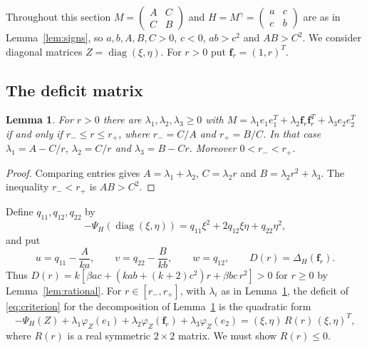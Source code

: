 \documentclass[11pt]{amsart}
\newtheorem{lemma}[theorem]{Lemma}
\theoremstyle{definition}
\theoremstyle{remark}
\numberwithin{equation}{section}
\newcommand{\diag}{\operatorname{diag}}
\newcommand{\bff}{\mathbf{f}}
\begin{document}
Throughout this section $M=\begin{pmatrix}A&C\\ C&B\end{pmatrix}$ and $H=M^\gamma=\begin{pmatrix}a&c\\ c&b\end{pmatrix}$ are as in Lemma~\ref{lem:signs}, so $a,b,A,B,C>0$, $c<0$, $ab>c^2$ and $AB>C^2$. We consider diagonal matrices $Z=\diag(\xi,\eta)$. For $r>0$ put $\bff_r=(1,r)^T$.

\subsection{The deficit matrix}

\begin{lemma}\label{lem:threedec}
For $r>0$ there are $\lambda_1,\lambda_2,\lambda_3\ge0$ with $M=\lambda_1e_1e_1^T+\lambda_2\bff_r\bff_r^T+\lambda_3e_2e_2^T$ if and only if $r_-\le r\le r_+$, where $r_-=C/A$ and $r_+=B/C$. In that case $\lambda_1=A-C/r$, $\lambda_2=C/r$ and $\lambda_3=B-Cr$. Moreover $0<r_-<r_+$.
\end{lemma}

\begin{proof}
Comparing entries gives $A=\lambda_1+\lambda_2$, $C=\lambda_2r$ and $B=\lambda_2r^2+\lambda_3$. The inequality $r_-<r_+$ is $AB>C^2$.
\end{proof}

Define $q_{11},q_{12},q_{22}$ by
\begin{equation}\label{eq:q}
-\Psi_H(\diag(\xi,\eta))=q_{11}\xi^2+2q_{12}\xi\eta+q_{22}\eta^2,
\end{equation}
and put
\begin{equation}\label{eq:uvw}
u=q_{11}-\frac A{ka},\qquad v=q_{22}-\frac B{kb},\qquad w=q_{12},\qquad D(r)=\Delta_H(\bff_r).
\end{equation}
Thus $D(r)=k[\beta ac+(kab+(k+2)c^2)r+\beta bc\,r^2]>0$ for $r\ge0$ by Lemma~\ref{lem:rational}. For $r\in[r_-,r_+]$, with $\lambda_i$ as in Lemma~\ref{lem:threedec}, the deficit of \eqref{eq:criterion} for the decomposition of Lemma~\ref{lem:threedec} is the quadratic form
\[
-\Psi_H(Z)+\lambda_1\varphi_Z(e_1)+\lambda_2\varphi_Z(\bff_r)+\lambda_3\varphi_Z(e_2)=(\xi,\eta)\,R(r)\,(\xi,\eta)^T ,
\]
where $R(r)$ is a real symmetric $2\times2$ matrix. We must show $R(r)\le0$.
\end{document}
